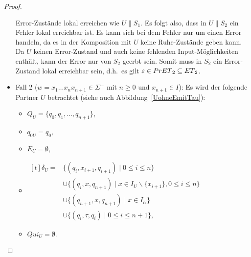 \begin{proof}
\begin{itemize}
      Error-Zustände lokal erreichen wie $U\|S_1$. Es folgt also, dass in $U\|S_2$ ein Fehler lokal
      erreichbar ist. Es kann sich bei dem Fehler nur um einen Error handeln,
      da es in der Komposition mit $U$ keine Ruhe-Zustände geben kann. Da $U$
      keinen Error-Zustand und auch keine fehlenden Input-Möglichkeiten
      enthält, kann der Error nur von $S_2$ geerbt sein. Somit muss in $S_2$
      ein Error-Zustand lokal erreichbar sein, d.h.\ es gilt $\varepsilon\in
      PrET{}_2\subseteq ET{}_2$.
    \item Fall 2 ($w=x_1\dots x_nx_{n+1}\in\Sigma{} ^+$ mit $n\geq 0$ und
      $x_{n+1}\in I$): Es wird der folgende Partner $U$ betrachtet (siehe auch
      Abbildung~\ref{UohneEmitTau}):
      \begin{itemize}
        \item $Q_U=\{q_0,q_1,\dots ,q_{n+1}\}$,
        \item $q_{0U}=q_0$,
        \item $E_U=\emptyset$,
        \item $\begin{aligned}[t]
            \delta _U=&\{(q_i,x_{i+1},q_{i+1})\mid  0\leq i\leq n\}\\
                      &\cup\{(q_i,x,q_{n+1})\mid  x\in I_U\backslash\{x_{i+1}\},
          0\leq i\leq n\}\\
          &\cup\{(q_{n+1},x,q_{n+1})\mid  x\in I_U\}\\
          &\cup\{(q_i,\tau,q_i)\mid 0\leq i\leq n+1\},
        \end{aligned}$
        \item $Qui_U = \emptyset$.
      \end{itemize}
      \begin{figure} [h!tbp]
      \begin{center}
\end{center}
\end{figure}
\end{itemize}
\end{proof}
